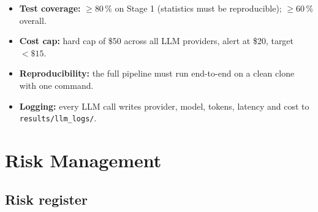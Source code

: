 \documentclass[11pt, a4paper, oneside, openany]{report}
\begin{document}
\begin{itemize}[leftmargin=*]
    \item \textbf{Test coverage:} $\geq 80\,\%$ on Stage 1 (statistics must be reproducible); $\geq 60\,\%$ overall.
    \item \textbf{Cost cap:} hard cap of \$50 across all LLM providers, alert at \$20, target $< \$15$.
    \item \textbf{Reproducibility:} the full pipeline must run end-to-end on a clean clone with one command.
    \item \textbf{Logging:} every LLM call writes provider, model, tokens, latency and cost to \texttt{results/llm\_logs/}.
\end{itemize}

\chapter{Risk Management}
\label{ch:risks}

\section{Risk register}
\end{document}
